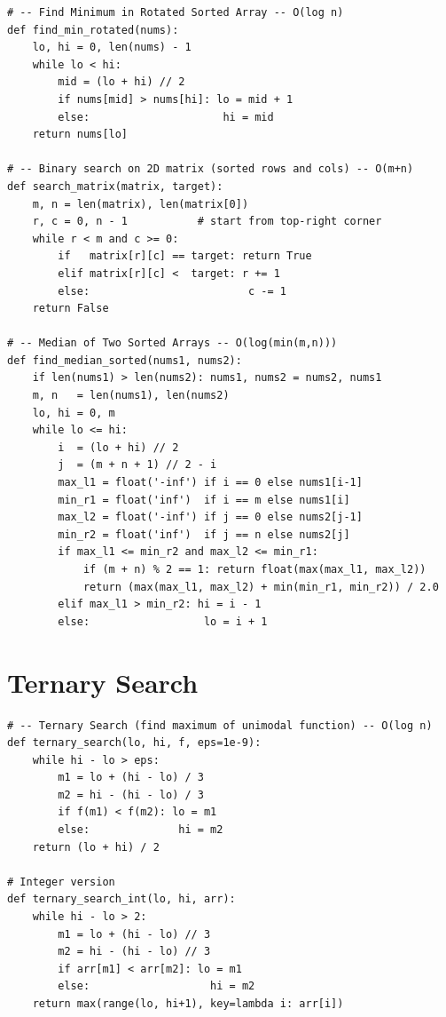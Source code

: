 \documentclass[11pt,a4paper]{report}
\begin{document}
\begin{lstlisting}
# -- Find Minimum in Rotated Sorted Array -- O(log n)
def find_min_rotated(nums):
    lo, hi = 0, len(nums) - 1
    while lo < hi:
        mid = (lo + hi) // 2
        if nums[mid] > nums[hi]: lo = mid + 1
        else:                     hi = mid
    return nums[lo]

# -- Binary search on 2D matrix (sorted rows and cols) -- O(m+n)
def search_matrix(matrix, target):
    m, n = len(matrix), len(matrix[0])
    r, c = 0, n - 1           # start from top-right corner
    while r < m and c >= 0:
        if   matrix[r][c] == target: return True
        elif matrix[r][c] <  target: r += 1
        else:                         c -= 1
    return False

# -- Median of Two Sorted Arrays -- O(log(min(m,n)))
def find_median_sorted(nums1, nums2):
    if len(nums1) > len(nums2): nums1, nums2 = nums2, nums1
    m, n   = len(nums1), len(nums2)
    lo, hi = 0, m
    while lo <= hi:
        i  = (lo + hi) // 2
        j  = (m + n + 1) // 2 - i
        max_l1 = float('-inf') if i == 0 else nums1[i-1]
        min_r1 = float('inf')  if i == m else nums1[i]
        max_l2 = float('-inf') if j == 0 else nums2[j-1]
        min_r2 = float('inf')  if j == n else nums2[j]
        if max_l1 <= min_r2 and max_l2 <= min_r1:
            if (m + n) % 2 == 1: return float(max(max_l1, max_l2))
            return (max(max_l1, max_l2) + min(min_r1, min_r2)) / 2.0
        elif max_l1 > min_r2: hi = i - 1
        else:                  lo = i + 1
\end{lstlisting}

\section{Ternary Search}

\begin{lstlisting}
# -- Ternary Search (find maximum of unimodal function) -- O(log n)
def ternary_search(lo, hi, f, eps=1e-9):
    while hi - lo > eps:
        m1 = lo + (hi - lo) / 3
        m2 = hi - (hi - lo) / 3
        if f(m1) < f(m2): lo = m1
        else:              hi = m2
    return (lo + hi) / 2

# Integer version
def ternary_search_int(lo, hi, arr):
    while hi - lo > 2:
        m1 = lo + (hi - lo) // 3
        m2 = hi - (hi - lo) // 3
        if arr[m1] < arr[m2]: lo = m1
        else:                   hi = m2
    return max(range(lo, hi+1), key=lambda i: arr[i])
\end{lstlisting}
\end{document}
